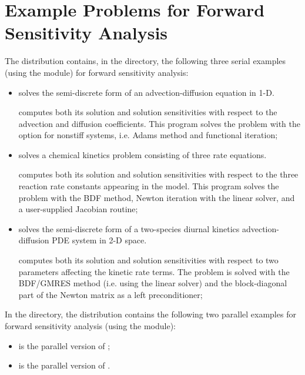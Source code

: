 \section{Example Problems for Forward Sensitivity Analysis}\label{s:fwd_examples}

The {\cvodes} distribution contains, in the 
directory, the following three serial examples (using the {\nvecs} module)
for forward sensitivity analysis:
\begin{itemize}
\item {}
  solves the semi-discrete form of an advection-diffusion equation in 1-D.

  {\cvodes} computes both its solution and solution sensitivities with respect
  to the advection and diffusion coefficients.
  This program solves the problem with the option for nonstiff systems,
  i.e. Adams method and functional iteration;
\item {}
  solves a chemical kinetics problem consisting of three rate equations.

  {\cvodes} computes both its solution and solution sensitivities with respect
  to the three reaction rate constants appearing in the model. 
  This program solves the problem with the BDF method, Newton          
  iteration with the {\cvdense} linear solver, and a user-supplied    
  Jacobian routine;
\item {}
  solves the semi-discrete form of a two-species diurnal kinetics
  advection-diffusion PDE system in 2-D space.

  {\cvodes} computes both its solution and solution sensitivities with respect
  to two parameters affecting the kinetic rate terms.
  The problem is solved with the BDF/GMRES method (i.e.    
  using the {\cvspgmr} linear solver) and the block-diagonal part of the  
  Newton matrix as a left preconditioner;
\end{itemize}

\noindent In the  directory, the {\cvodes} distribution 
contains the following two parallel examples for forward sensitivity analysis
(using the {\nvecp} module):
\begin{itemize}
\item {}
  is the parallel version of ;
\item {}
  is the parallel version of .
\end{itemize}

